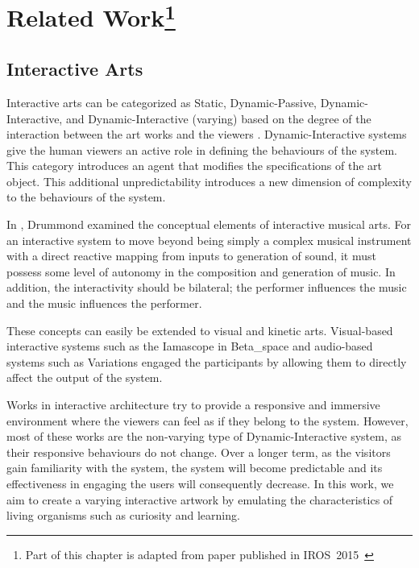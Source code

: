 \chapter[Related Work]{Related Work\footnote{Part of this chapter is adapted from paper published in IROS~2015~\cite{Chan2015}}} 
 \label{chap:related_work}


\section{Interactive Arts}
Interactive arts can be categorized as Static, Dynamic-Passive, Dynamic-Interactive, and Dynamic-Interactive (varying) based on the degree of the interaction between the art works and the viewers \cite{Edmonds2004}. Dynamic-Interactive systems give the human viewers an active role in defining the behaviours of the system. This category introduces an agent that modifies the specifications of the art object. This additional unpredictability introduces a new dimension of complexity to the behaviours of the system. 

In \cite{Drummond2009}, Drummond examined the conceptual elements of interactive musical arts. For an interactive system to move beyond being simply a complex musical instrument with a direct reactive mapping from inputs to generation of sound, it must possess some level of autonomy in the composition and generation of music. In addition, the interactivity should be bilateral; the performer influences the music and the music influences the performer. 

These concepts can easily be extended to visual and kinetic arts. Visual-based interactive systems such as the Iamascope in Beta\_space \cite{Costello2005} and audio-based systems such as Variations \cite{Wands2005} engaged the participants by allowing them to directly affect the output of the system. %

Works in interactive architecture \cite{Beesley2010}\cite{Hangar.org} try to provide a responsive and immersive environment where the viewers can feel as if they belong to the system. %
However, most of these works are the non-varying type of Dynamic-Interactive system, as their responsive behaviours do not change. Over a longer term, as the visitors gain familiarity with the system, the system will become predictable and its effectiveness in engaging the users will consequently decrease. In this work, we aim to create a varying interactive artwork by emulating the characteristics of living organisms such as curiosity and learning. 

